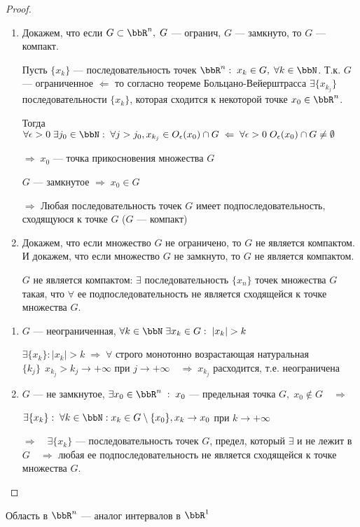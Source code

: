 \begin{proof}
\begin{enumerate}
\item
Докажем, что если $G \subset \bbR^n, \; G$ --- огранич, $G$ --- замкнуто, то $G$ --- компакт.

Пусть $\{ x_k \}$ --- последовательность точек $\bbR^n: \; x_k \in G, \; \forall k \in \bbN$. Т.к. $G$ --- ограниченное $\Leftarrow$ то согласно теореме Больцано-Вейерштрасса $\exists \{ x_{k_j} \}$ последовательности $\{ x_k \}$, которая сходится к некоторой точке $x_0 \in \bbR^n$.

Тогда $\forall \epsilon > 0 \; \exists j_0 \in \bbN: \; \forall j > j_0, x_{k_j} \in O_\epsilon(x_0) \cap G \; \Leftarrow \; \forall \epsilon > 0 \; O_\epsilon(x_0) \cap G \not= \emptyset$

$\Rightarrow \; x_0$ --- точка прикосновения множества $G$

$G$ --- замкнутое $\Rightarrow \; x_0 \in G$

$\Rightarrow$ Любая последовательность точек $G$ имеет подпоследовательность, сходящуюся к точке $G$ ($G$ --- компакт)

\item

Докажем, что если множество $G$ не ограничено, то $G$ не является компактом. И докажем, что если множество $G$ не замкнуто, то $G$ не является компактом.

$G$ не является компактом: $\exists$ последовательность $\{ x_n \}$ точек множества $G$ такая, что $\forall$ ее подпоследовательность не является сходящейся к точке множества $G$. 
\end{enumerate}

\begin{enumerate}
\item

$G$ --- неограниченная, $\forall k \in \bbN \; \exists x_k \in G: \; |x_k| > k$

$\exists \{ x_k \}: |x_k| > k \; \Rightarrow \; \forall$ строго монотонно возрастающая натуральная $\{ k_j \}\ \  x_{k_j} > k_j \to +\infty$ при $j \to +\infty \quad \Rightarrow \; x_{k_j}$ расходится, т.е. неограничена 

\item

$G$ --- не замкнутое, $\exists x_0 \in \bbR^n \;:\; x_0$ --- предельная точка $G, \; x_0 \notin G \quad \Rightarrow$

$\exists \{ x_k \}: \; \forall k \in \bbN: x_k \in G \setminus \{ x_0 \}, x_k \to x_0$ при $k \to +\infty$

$\Rightarrow \quad \exists \{ x_k \}$ --- последовательность точек $G$, предел, который $\exists$ и не лежит в $G \quad \Rightarrow$  любая ее подпоследовательность не является сходящейся к точке множества $G$.\qedhere
\end{enumerate}
\end{proof}
Область в $\bbR^n$ --- аналог интервалов в $\bbR^1$

